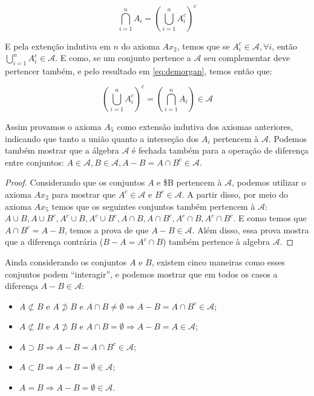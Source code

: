 \documentclass[
]{article}
\providecommand{\tightlist}{%
  \setlength{\itemsep}{0pt}\setlength{\parskip}{0pt}}
\theoremstyle{definition}
\theoremstyle{definition}
\theoremstyle{definition}
\theoremstyle{definition}
\theoremstyle{remark}
\begin{document}
\begin{equation}
\bigcap_{i=1}^{n}A_{i} = \left(\bigcup_{i = 1}^{n}A_{i}^{c}\right)^{c}
\label{eq:demorgan}
\end{equation}

E pela extenção indutiva em \(n\) do axioma \(Ax_{2}\), temos que se \(A_{i}^{c} \in \mathcal{A}, \forall i\), então \(\bigcup_{i = 1}^{n}A_{i}^{c} \in \mathcal{A}\). E como, se um conjunto pertence a \(\mathcal{A}\) seu complementar deve pertencer também, e pelo resultado em \eqref{eq:demorgan}, temos então que:

\begin{equation}
\left(\bigcup_{i = 1}^{n}A_{i}^{c}\right)^{c} = \left(\bigcap_{i = 1}^{n}A_{i}\right) \in \mathcal{A}
\label{eq:axioma5}
\end{equation}

Assim provamos o axioma \(A_{5}\) como extensão indutiva dos axiomas anteriores, indicando que tanto a união quanto a interseção dos \(A_{i}\) pertencem à \(\mathcal{A}\). Podemos também mostrar que a álgebra \(\mathcal{A}\) é fechada também para a operação de diferença entre conjuntos: \(A \in \mathcal{A}, B \in \mathcal{A}, A-B = A \cap B^{c} \in \mathcal{A}\).

\begin{proof}
Considerando que os conjuntos \(A\) e \$B pertencem à \(\mathcal{A}\), podemos utilizar o axioma \(Ax_{2}\) para mostrar que \(A^{c} \in \mathcal{A}\) e \(B^{c} \in \mathcal{A}\). A partir disso, por meio do axioma \(Ax_{5}\) temos que os seguintes conjuntos também pertencem à \(\mathcal{A}\): \(A \cup B, A \cup B^{c}, A^{c} \cup B, A^{c} \cup B^{c}, A \cap B, A \cap B^{c}, A^{c} \cap B, A^{c} \cap B^{c}\). E como temos que \(A \cap B^{c} = A-B\), temos a prova de que \(A-B \in \mathcal{A}\). Além disso, essa prova mostra que a diferença contrária (\(B - A = A^{c} \cap B\)) também pertence à algebra \(\mathcal{A}\).
\end{proof}

Ainda considerando os conjuntos \(A\) e \(B\), existem cinco maneiras como esses conjuntos podem ``interagir'', e podemos mostrar que em todos os casos a diferença \(A-B \in \mathcal{A}\):

\begin{itemize}
\tightlist
\item
  \(A \not\subset B\) e \(A \not\supset B\) e \(A \cap B \neq \emptyset \Rightarrow A-B = A \cap B^{c} \in \mathcal{A}\);
\item
  \(A \not\subset B\) e \(A \not\supset B\) e \(A \cap B = \emptyset \Rightarrow A-B = A \in \mathcal{A}\);
\item
  \(A \supset B \Rightarrow A-B = A \cap B^{c} \in \mathcal{A}\);
\item
  \(A \subset B \Rightarrow A-B = \emptyset \in \mathcal{A}\);
\item
  \(A = B \Rightarrow A-B = \emptyset \in \mathcal{A}\).
\end{itemize}
\end{document}
